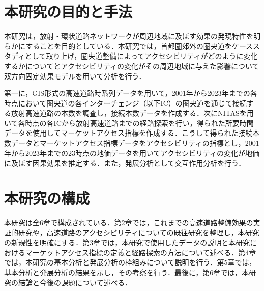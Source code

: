 \section{本研究の目的と手法}

本研究は，放射・環状道路ネットワークが周辺地域に及ぼす効果の発現特性を明らかにすることを目的としている．本研究では，首都圏郊外の圏央道をケーススタディとして取り上げ，圏央道整備によってアクセシビリティがどのように変化するかについてとアクセシビリティの変化がその周辺地域に与えた影響について双方向固定効果モデルを用いて分析を行う．

第一に，GIS形式の高速道路時系列データを用いて，2001年から2023年までの各時点において圏央道の各インターチェンジ（以下IC）の圏央道を通じて接続する放射高速道路の本数を調査し，接続本数データを作成する．次にNITASを用いて各時点の各ICから放射高速道路までの経路探索を行い，得られた所要時間データを使用してマーケットアクセス指標を作成する．こうして得られた接続本数データとマーケットアクセス指標データをアクセシビリティの指標とし，2001年から2023年までの23時点の地価データを用いてアクセシビリティの変化が地価に及ぼす因果効果を推定する．また，発展分析として交互作用分析を行う．

\section{本研究の構成}

本研究は全6章で構成されている．第2章では，これまでの高速道路整備効果の実証的研究や，高速道路のアクセシビリティについての既往研究を整理し，本研究の新規性を明確にする．第3章では，本研究で使用したデータの説明と本研究におけるマーケットアクセス指標の定義と経路探索の方法について述べる．第4章では，本研究の基本分析と発展分析の枠組みについて説明を行う．第5章では，基本分析と発展分析の結果を示し，その考察を行う．最後に，第6章では，本研究の結論と今後の課題について述べる．

